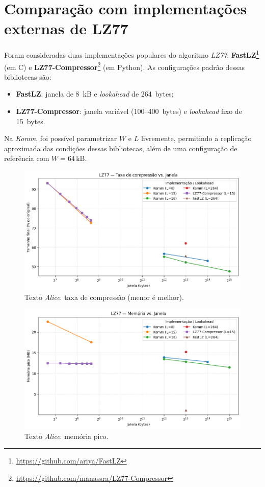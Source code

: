 \section{Comparação com implementações externas de LZ77}\label{sec:externas}

Foram consideradas duas implementações populares do algoritmo \textit{LZ77}: \textbf{FastLZ}\footnote{\url{https://github.com/ariya/FastLZ}} (em C) e \textbf{LZ77-Compressor}\footnote{\url{https://github.com/manassra/LZ77-Compressor}} (em Python).  
As configurações padrão dessas bibliotecas são:
\begin{itemize}
  \item \textbf{FastLZ}: janela de 8~kB e \textit{lookahead} de 264~bytes;
  \item \textbf{LZ77-Compressor}: janela variável (100–400~bytes) e \textit{lookahead} fixo de 15~bytes.
\end{itemize}

Na \textit{Komm}, foi possível parametrizar \(W\) e \(L\) livremente, permitindo a replicação aproximada das condições dessas bibliotecas, além de uma configuração de referência com \(W=64\,\text{kB}\).

\begin{figure}[htp]
  \centering
  \caption{Texto \textit{Alice}: taxa de compressão (menor é melhor).}
  \label{fig:external-alice-compression}
  \includegraphics[width=15cm]{figuras/lz77_alice_compression_window.png}
\end{figure}

\begin{figure}[htp]
  \centering
  \caption{Texto \textit{Alice}: memória pico.}
  \label{fig:external-alice-memory}
  \includegraphics[width=15cm]{figuras/lz77_alice_memory_window.png}
\end{figure}

